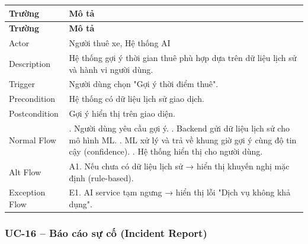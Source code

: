 \begin{longtable}{|>{\raggedright\arraybackslash}p{4cm}|>{\raggedright\arraybackslash}p{11cm}|}
\hline
\textbf{Trường} & \textbf{Mô tả} \\
\hline
\endfirsthead

\hline
\textbf{Trường} & \textbf{Mô tả} \\
\hline
\endhead

\hline
\endfoot

Actor & Người thuê xe, Hệ thống AI \\
\hline
Description & Hệ thống gợi ý thời gian thuê phù hợp dựa trên dữ liệu lịch sử và hành vi người dùng. \\
\hline
Trigger & Người dùng chọn "Gợi ý thời điểm thuê". \\
\hline
Precondition & Hệ thống có dữ liệu lịch sử giao dịch. \\
\hline
Postcondition & Gợi ý hiển thị trên giao diện. \\
\hline
Normal Flow & 1. Người dùng yêu cầu gợi ý. \newline 2. Backend gửi dữ liệu lịch sử cho mô hình ML. \newline 3. ML xử lý và trả về khung giờ gợi ý cùng độ tin cậy (confidence). \newline 4. Hệ thống hiển thị cho người dùng. \\
\hline
Alt Flow & A1. Nếu chưa có dữ liệu lịch sử → hiển thị khuyến nghị mặc định (rule-based). \\
\hline
Exception Flow & E1. AI service tạm ngưng → hiển thị lỗi "Dịch vụ không khả dụng". \\
\hline
\end{longtable}

\subsubsection*{UC-16 – Báo cáo sự cố (Incident Report)}

